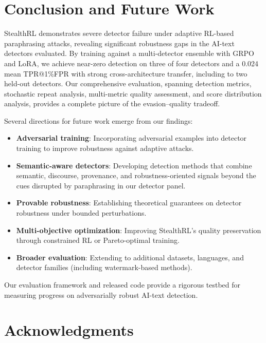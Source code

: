 \documentclass[11pt]{article}
\begin{document}
\section{Conclusion and Future Work}
\label{sec:conclusion}

StealthRL demonstrates severe detector failure under adaptive RL-based paraphrasing attacks, revealing significant robustness gaps in the AI-text detectors evaluated. By training against a multi-detector ensemble with GRPO and LoRA, we achieve near-zero detection on three of four detectors and a 0.024 mean TPR@1\%FPR with strong cross-architecture transfer, including to two held-out detectors. Our comprehensive evaluation, spanning detection metrics, stochastic repeat analysis, multi-metric quality assessment, and score distribution analysis, provides a complete picture of the evasion--quality tradeoff.

Several directions for future work emerge from our findings:
\begin{itemize}[leftmargin=*,itemsep=2pt]
  \item \textbf{Adversarial training}: Incorporating adversarial examples into detector training to improve robustness against adaptive attacks.
  \item \textbf{Semantic-aware detectors}: Developing detection methods that combine semantic, discourse, provenance, and robustness-oriented signals beyond the cues disrupted by paraphrasing in our detector panel.
  \item \textbf{Provable robustness}: Establishing theoretical guarantees on detector robustness under bounded perturbations.
  \item \textbf{Multi-objective optimization}: Improving StealthRL's quality preservation through constrained RL or Pareto-optimal training.
  \item \textbf{Broader evaluation}: Extending to additional datasets, languages, and detector families (including watermark-based methods).
\end{itemize}

Our evaluation framework and released code provide a rigorous testbed for measuring progress on adversarially robust AI-text detection.

\section*{Acknowledgments}
\end{document}
